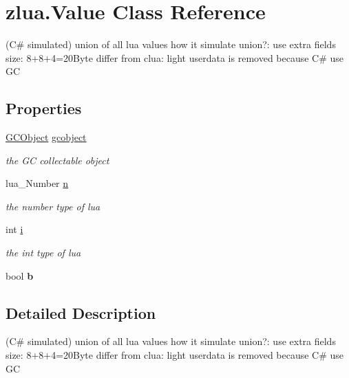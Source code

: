 \hypertarget{classzlua_1_1_value}{}\section{zlua.\+Value Class Reference}
\label{classzlua_1_1_value}


(C\# simulated) union of all lua values how it simulate union?\+: use extra fields size\+: 8+8+4=20\+Byte differ from clua\+: light userdata is removed because C\# use GC  


\subsection*{Properties}
\begin{DoxyCompactItemize}
\item 
\mbox{\hyperlink{classzlua_1_1_g_c_object}{G\+C\+Object}} \mbox{\hyperlink{classzlua_1_1_value_af997ede3cb8de1aceb31d342a3f878bb}{gcobject}}
\begin{DoxyCompactList}\small\item\em the GC collectable object \end{DoxyCompactList}\item 
lua\+\_\+\+Number \mbox{\hyperlink{classzlua_1_1_value_a2e93be2270276b85ddbbe0eb6e1cf447}{n}}
\begin{DoxyCompactList}\small\item\em the number type of lua \end{DoxyCompactList}\item 
int \mbox{\hyperlink{classzlua_1_1_value_a310972c4cacdce5ad26c822d4837591d}{i}}
\begin{DoxyCompactList}\small\item\em the int type of lua \end{DoxyCompactList}\item 
\mbox{\label{classzlua_1_1_value_a4bfc8554ad810a169d2eda2e6f0f234d}} 
bool {\bfseries b}
\end{DoxyCompactItemize}


\subsection{Detailed Description}
(C\# simulated) union of all lua values how it simulate union?\+: use extra fields size\+: 8+8+4=20\+Byte differ from clua\+: light userdata is removed because C\# use GC 




